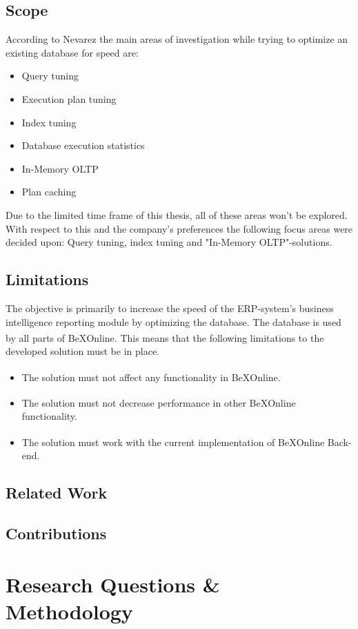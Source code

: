 \documentclass{cslthse-msc}
\newcommand{\bex}{BeX\textsuperscript{\textregistered}}
\begin{document}
\section{Scope} \label{sec:scope}
According to Nevarez \cite{Nevarez} the main areas of investigation while trying to optimize an existing database for speed are:
\begin{itemize}
\item Query tuning
\item Execution plan tuning
\item Index tuning
\item Database execution statistics
\item In-Memory OLTP
\item Plan caching
\end{itemize}
Due to the limited time frame of this thesis, all of these areas won't be explored. With respect to this and the company's preferences the following focus areas were decided upon: Query tuning, index tuning and "In-Memory OLTP"-solutions.

\section{Limitations}

The objective is primarily to increase the speed of the ERP-system's business intelligence reporting module by optimizing the database. The database is used by all parts of \bex Online. This means that the following limitations to the developed solution must be in place.

\begin{itemize}
\item The solution must not affect any functionality in \bex Online.
\item The solution must not decrease performance in other \bex Online functionality.
\item The solution must work with the current implementation of \bex Online Back-end.
\end{itemize}

\section{Related Work}

\section{Contributions}

\chapter{Research Questions \& Methodology}
\end{document}
